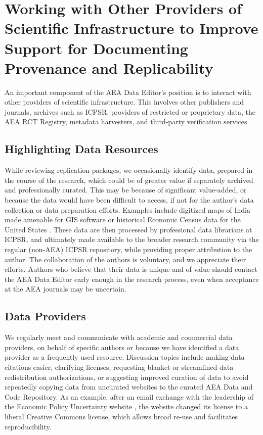 \documentclass[PP]{AEA}
\newcommand{\aeadcr}{AEA Data and Code Repository}
\begin{document}
\section{Working with Other Providers of Scientific Infrastructure to Improve Support for Documenting Provenance and Replicability}
\label{sec:coordination}

An important component of the AEA Data Editor's position is to interact with other providers of scientific infrastructure. This involves other publishers and journals, archives such as ICPSR, providers of restricted or proprietary data, the AEA RCT Registry, metadata harvesters, and third-party verification services. 

\subsection{Highlighting Data Resources}

While reviewing replication packages, we occasionally identify data, prepared in the course of the research, which could be of greater value if separately archived and professionally curated. This may be because of significant value-added, or because the data would have been difficult to access, if not for the author's data collection or data preparation efforts. Examples include digitized maps of India made amenable for GIS software \citep{10.1257/aer.20171673} or historical Economic Census data for the United States \citep{ganapati2020}. These data are then processed by professional data librarians at ICPSR, and ultimately made available to the broader research community via the regular (non-AEA) ICPSR repository, while providing proper attribution to the author. The collaboration of the authors is voluntary, and we appreciate their efforts. Authors who believe that their data is unique and of value should contact the AEA Data Editor early enough in the research process, even when acceptance at the AEA journals may be uncertain. 

\subsection{Data Providers}
\label{sec:producers}

We regularly meet and communicate with academic and commercial data providers, on behalf of specific authors or because we have identified a data provider as a frequently used resource. Discussion topics include making data citations easier, clarifying licenses, requesting blanket or streamlined data redistribution authorizations, or suggesting improved curation of data to avoid repeatedly copying data from uncurated websites to the curated \aeadcr{}. As an example, after an email exchange with the leadership of the Economic Policy Uncertainty website \citep{10.1093/qje/qjw024}, the website changed its license to a liberal Creative Commons license, which allows broad re-use and facilitates reproducibility.
\end{document}
